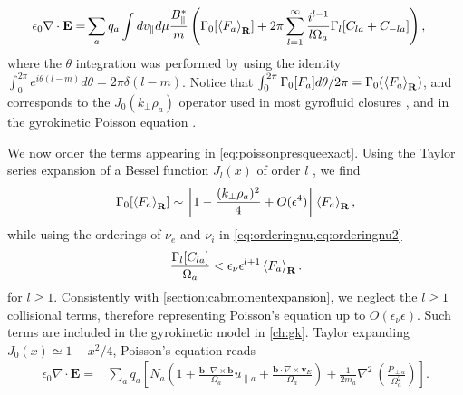 {{\begin{equation}
\begin{split}
    \epsilon_0 \nabla \cdot \mathbf E =& \sum_a q_a \int  dv_\parallel d\mu \frac{B_\parallel^*}{m}  \left( \Gamma_0[\left< F_a \right>_{\mathbf R}] +  2\pi\sum_{l=1}^{\infty} \frac{i^{l-1}}{l\Omega_a}\Gamma_l[C_{l a}+C_{-l a}]\right),
\end{split}
\label{eq:poissonpresqueexact}
\end{equation}
%
where the $\theta$ integration was performed by using the identity $\int_0^{2\pi} e^{i\theta(l-m)} d\theta = 2\pi \delta(l-m)$.
Notice that $\int_0^{2\pi}\Gamma_0[F_a]d\theta/2\pi = \Gamma_0(\left< F_a \right>_{\mathbf R})$, and corresponds to the $J_0(k_\perp \rho_a)$ operator used in most gyrofluid closures \citep{Hammett1992a,Dorland1993,Snyder2001,Madsen2013}, and in the gyrokinetic Poisson equation \citep{Lee1983,Dubin1983a}.

We now order the terms appearing in \cref{eq:poissonpresqueexact}. Using the Taylor series expansion of a Bessel function $J_l(x)$ of order $l$ \citep{Abramowitz1972}, we find
%
\begin{equation}
    \Gamma_0[\left< F_a \right>_{\mathbf R}] \sim \left[1 - \frac{(k_{\perp} \rho_a)^2}{4} + O(\epsilon^{4})\right]\left< F_a \right>_{\mathbf R},
\end{equation}
%
while using the orderings of $\nu_e$ and $\nu_i$ in \cref{eq:orderingnu,eq:orderingnu2}
%
\begin{equation}
    \frac{\Gamma_l[C_{la}]}{\Omega_a} < \epsilon_\nu\epsilon^{l+1} \left< F_a \right>_{\mathbf R}.
\end{equation}
%
for $l \ge 1$.
%
Consistently with \cref{section:cabmomentexpansion}, we neglect the $l\ge1$ collisional  terms, therefore representing Poisson's equation up to $O(\epsilon_\nu \epsilon)$.
%
Such terms are included in the gyrokinetic model in \cref{ch:gk}.
%
%
Taylor expanding $J_0(x) \simeq 1-x^2/4$, Poisson's equation reads
%
\begin{equation}
\begin{split}
    \epsilon_0 \nabla \cdot \mathbf E=&\sum_a q_a\left[N_{a}\left(1+\frac{\mathbf b \cdot \nabla \times \mathbf b}{\Omega_a} u_{\parallel a}+\frac{\mathbf b \cdot \nabla \times \mathbf v_E}{\Omega_a}\right) +\frac{1}{2m_a}\nabla_\perp^2 \left(\frac{P_{\perp a}}{\Omega_a^2}\right)\right].
\end{split}
    \label{eq:poissonfin2}
\end{equation}


}}
